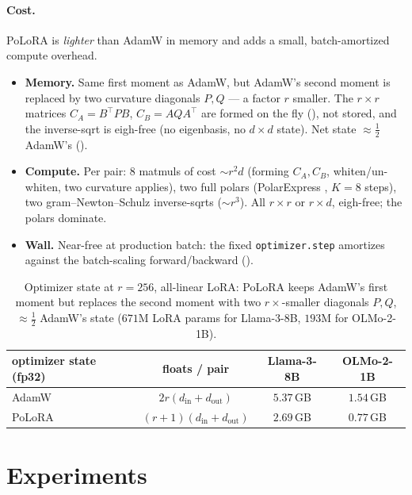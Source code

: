 \documentclass[11pt]{article}
\newcommand{\methodname}{PoLoRA\xspace}
\theoremstyle{plain}
\theoremstyle{definition}
\theoremstyle{remark}
\begin{document}
\paragraph{Cost.} \methodname{} is \emph{lighter} than AdamW in memory and adds a small, batch-amortized compute overhead.
\begin{itemize}[leftmargin=1.5em,itemsep=1pt,topsep=2pt]
  \item \textbf{Memory.} Same first moment as AdamW, but AdamW's second moment is replaced by two curvature diagonals $P,Q$ --- a factor $r$ smaller. The $r\times r$ matrices $C_A=B^\top PB$, $C_B=AQA^\top$ are formed on the fly (), not stored, and the inverse-sqrt is eigh-free (no eigenbasis, no $d\times d$ state). Net state ${\approx}\tfrac12$ AdamW's ().
  \item \textbf{Compute.} Per pair: $8$ matmuls of cost ${\sim}r^2d$ (forming $C_A,C_B$, whiten/un-whiten, two curvature applies), two full polars (PolarExpress \cite{polarexpress}, $K{=}8$ steps), two gram--Newton--Schulz inverse-sqrts \cite{gram_ns} (${\sim}r^3$). All $r\times r$ or $r\times d$, eigh-free; the polars dominate.
  \item \textbf{Wall.} Near-free at production batch: the fixed \texttt{optimizer.step} amortizes against the batch-scaling forward/backward ().
\end{itemize}
\begin{table}[h]
\centering\small
\begin{tabular}{lccc}
\toprule
optimizer state (fp32) & floats / pair & Llama-3-8B & OLMo-2-1B \\
\midrule
AdamW         & $2r(d_{\mathrm{in}}{+}d_{\mathrm{out}})$     & $5.37$\,GB & $1.54$\,GB \\
\methodname{} & $(r{+}1)(d_{\mathrm{in}}{+}d_{\mathrm{out}})$ & $2.69$\,GB & $0.77$\,GB \\
\bottomrule
\end{tabular}
\caption{Optimizer state at $r{=}256$, all-linear LoRA: \methodname{} keeps AdamW's first moment but replaces the second moment with two $r{\times}$-smaller diagonals $P,Q$, ${\approx}\tfrac12$ AdamW's state ($671$M LoRA params for Llama-3-8B, $193$M for OLMo-2-1B).}
\label{tab:optstate}
\end{table}

\section{Experiments}
\label{sec:exp}
\end{document}
